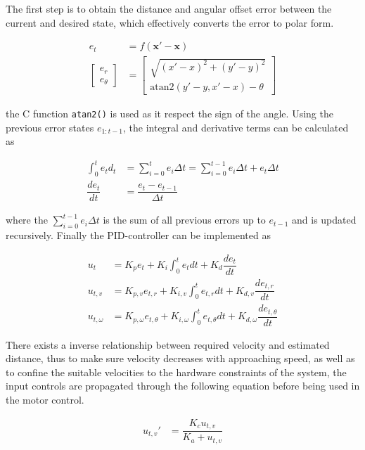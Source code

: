 The first step is to obtain the distance and angular offset error between the current and desired state, which effectively converts the error to polar form.

\begin{align}
    e_t &= f(\mathbf{x}' - \mathbf{x}) \\
    \begin{bmatrix} e_r \\ e_\theta \end{bmatrix} &= \begin{bmatrix}
        \sqrt{(x' - x)^2 + (y' - y)^2} \\
        \text{atan2}(y' - y, x' - x) - \theta
    \end{bmatrix}
\end{align}

the C function \texttt{atan2()} is used as it respect the sign of the angle. Using the previous error states $e_{1:t-1}$, the integral and derivative terms can be calculated as

\begin{align}
    \int_0^t e_t d_t &= \sum_{i=0}^t e_i \Delta t = \sum_{i=0}^{t-1} e_i \Delta t + e_t \Delta t \\
    \dfrac{de_t}{dt} &= \dfrac{e_t - e_{t-1}}{\Delta t}
\end{align}

where the $\sum_{i=0}^{t-1} e_i \Delta t$ is the sum of all previous errors up to $e_{t-1}$ and is updated recursively. Finally the PID-controller can be implemented as

\begin{align}
    u_t &= K_p e_t + K_i \int_0^t e_t dt + K_d \dfrac{de_t}{dt} \\
    u_{t,v} &= K_{p,v} e_{t,r} + K_{i,v} \int_0^t e_{t,r} dt + K_{d,v} \dfrac{de_{t,r}}{dt} \\
    u_{t,\omega} &= K_{p,\omega} e_{t,\theta} + K_{i,\omega} \int_0^t e_{t,\theta} dt + K_{d,\omega} \dfrac{de_{t,\theta}}{dt}
\end{align}

There exists a inverse relationship between required velocity and estimated distance, thus to make sure velocity decreases with approaching speed, as well as to confine the suitable velocities to the hardware constraints of the system, the input controls are propagated through the following equation before being used in the motor control.

\begin{align}
	u_{t,v}' &= \dfrac{K_c u_{t,v}}{K_a + u_{t,v}}
\end{align}

